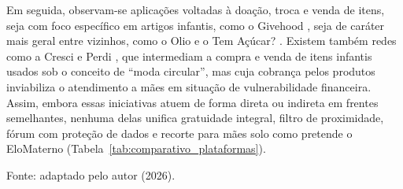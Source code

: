 Em seguida, observam-se aplicações voltadas à doação, troca e venda de itens, seja com foco específico em artigos infantis, como o Givehood \cite{givehood2026}, seja de caráter mais geral entre vizinhos, como o Olio \cite{olio2026} e o Tem Açúcar? \cite{temacucar2026}. Existem também redes como a Cresci e Perdi \cite{crescieperdi2026}, que intermediam a compra e venda de itens infantis usados sob o conceito de ``moda circular'', mas cuja cobrança pelos produtos inviabiliza o atendimento a mães em situação de vulnerabilidade financeira. Assim, embora essas iniciativas atuem de forma direta ou indireta em frentes semelhantes, nenhuma delas unifica gratuidade integral, filtro de proximidade, fórum com proteção de dados e recorte para mães solo como pretende o EloMaterno (Tabela~\ref{tab:comparativo_plataformas}).

\begin{table}[ht]
\centering
\caption{Comparativo entre Plataformas Existentes e o EloMaterno}
\label{tab:comparativo_plataformas}
\vspace{0.2cm}

{\small Fonte: adaptado pelo autor (2026).}
\end{table}
